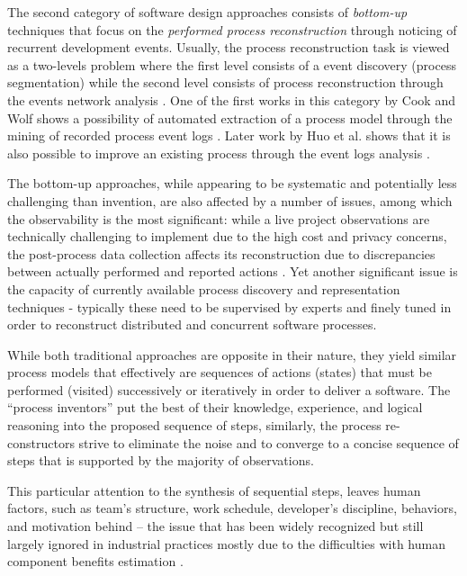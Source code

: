 The second category of software design approaches consists of \textit{bottom-up} techniques that focus 
on the \textit{performed process reconstruction} through noticing of recurrent development events. 
Usually, the process reconstruction task is viewed as a two-levels problem where the first level 
consists of a event discovery (process segmentation) while the second level consists of process 
reconstruction through the events network analysis \cite{citeulike:2703162}.
One of the first works in this category by Cook and Wolf shows a possibility of automated extraction 
of a process model through the mining of recorded process event logs 
\cite{citeulike:328044} \cite{citeulike:5120757} \cite{citeulike:5128143}. 
Later work by Huo et al. shows that it is also possible to improve an existing process
through the event logs analysis \cite{citeulike:7691059} \cite{citeulike:7690766}. 

The bottom-up approaches, while appearing to be systematic and potentially less challenging than invention, 
are also affected by a number of issues, among which the observability is the most significant: 
while a live project observations are technically challenging to implement due to the high cost and 
privacy concerns, the post-process data collection affects its reconstruction due to 
discrepancies between actually performed and reported actions \cite{citeulike:7691059}. 
Yet another significant issue is the capacity of currently available process discovery and representation 
techniques - typically these need to be supervised by experts and finely tuned in order to reconstruct 
distributed and concurrent software processes. 

While both traditional approaches are opposite in their nature, they yield similar process models that 
effectively are sequences of actions (states) that must be performed (visited) successively or iteratively 
in order to deliver a software. The ``process inventors'' put the best of their knowledge, experience, 
and logical reasoning into the proposed sequence of steps, similarly, the process re-constructors 
strive to eliminate the noise and to converge to a concise sequence of steps that is supported by the 
majority of observations. 

This particular attention to the synthesis of sequential steps, leaves human factors, such as team's 
structure, work schedule, developer's discipline, behaviors, and motivation behind -- 
the issue that has been widely recognized \cite{citeulike:149387} \cite{citeulike:113403} 
\cite{citeulike:205322} \cite{citeulike:12798652} but still largely ignored in industrial practices 
mostly due to the  difficulties with human component benefits estimation 
\cite{citeulike:12798659} \cite{citeulike:12798662} \cite{csdl2-12-11}.

